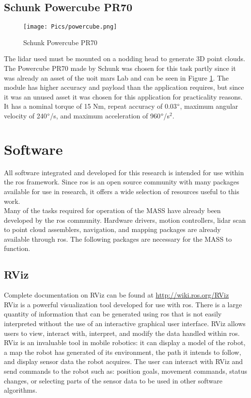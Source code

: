 \subsection{Schunk Powercube PR70}
\begin{figure}[H]
    \centering
    \texttt{[image: Pics/powercube.png]}
    \caption{Schunk Powercube PR70 \cite{schunkpage}}
    \label{fig:schunk}
\end{figure}
The \acrshort{lidar} used must be mounted on a nodding head to generate 3D point clouds. The Powercube PR70 made by Schunk was chosen for this task partly since it was already an asset of the \acrshort{uoit} \acrshort{mars} Lab and can be seen in Figure \ref{fig:schunk}. The module has higher accuracy and payload than the application requires, but since it was an unused asset it was chosen for this application for practicality reasons. It has a nominal torque of 15 Nm, repeat accuracy of 0.03$\degree$, maximum angular velocity of 240$\degree$/s, and maximum acceleration of 960$\degree$/s$^2$. \\
\section{Software}
\label{sec:software}
All software integrated and developed for this research is intended for use within the \acrshort{ros} framework. Since \acrshort{ros} is an open source community with many packages available for use in research, it offers a wide selection of resources useful to this work.\\

Many of the tasks required for operation of the MASS have already been developed by the \acrshort{ros} community. Hardware drivers, motion controllers, \acrshort{lidar} scan to point cloud assemblers, navigation, and mapping packages are already available through \acrshort{ros}. The following packages are necessary for the MASS to function.\\
\subsection{RViz}
\label{sec:RViz}

Complete documentation on RViz can be found at \url{http://wiki.ros.org/RViz}\\

RViz is a powerful visualization tool developed for use with \acrshort{ros}. There is a large quantity of information that can be generated using \acrshort{ros} that is not easily interpreted without the use of an interactive graphical user interface. RViz allows users to view, interact with, interpret, and modify the data handled within \acrshort{ros}. RViz is an invaluable tool in mobile robotics: it can display a model of the robot, a map the robot has generated of its environment, the path it intends to follow, and display sensor data the robot acquires. The user can interact with RViz and send commands to the robot such as: position goals, movement commands, status changes, or selecting parts of the sensor data to be used in other software algorithms.\\

